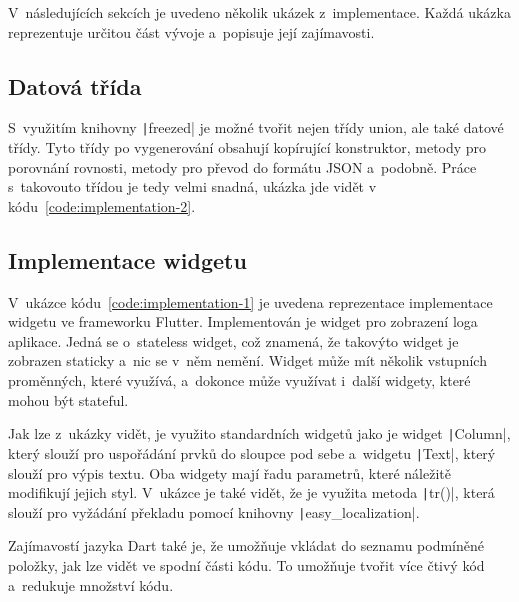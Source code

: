 V~následujících sekcích je uvedeno několik ukázek z~implementace.
Každá ukázka reprezentuje určitou část vývoje a~popisuje její zajímavosti.

\subsection{Datová třída}

S~využitím knihovny \texttt|freezed| je možné tvořit nejen
třídy union,
ale také datové třídy.
Tyto třídy po vygenerování obsahují kopírující konstruktor,
metody pro porovnání rovnosti,
metody pro převod do formátu JSON a~podobně.
Práce s~takovouto třídou je tedy velmi snadná,
ukázka jde vidět v kódu~\ref{code:implementation-2}.

\subsection{Implementace widgetu}

V~ukázce kódu~\ref{code:implementation-1} je uvedena reprezentace implementace widgetu
ve frameworku Flutter.
Implementován je widget pro zobrazení loga aplikace.
Jedná se o~stateless widget,
což znamená,
že takovýto widget je zobrazen staticky a~nic se v~něm nemění.
Widget může mít několik vstupních proměnných,
které využívá,
a~dokonce může využívat i~další widgety,
které mohou být stateful.

Jak lze z~ukázky vidět,
je využito standardních widgetů jako je widget \texttt|Column|,
který slouží pro uspořádání prvků do sloupce pod sebe
a~widgetu \texttt|Text|,
který slouží pro výpis textu.
Oba widgety mají řadu parametrů,
které náležitě modifikují jejich styl.
V~ukázce je také vidět,
že je využita metoda \texttt|tr()|,
která slouží pro vyžádání překladu pomocí knihovny \texttt|easy_localization|.

Zajímavostí jazyka Dart také je,
že umožňuje vkládat do seznamu podmíněné položky,
jak lze vidět ve spodní části kódu.
To umožňuje tvořit více čtivý kód a~redukuje množství kódu.

